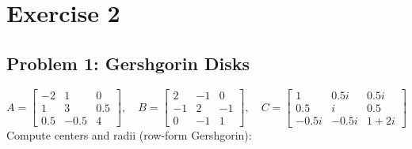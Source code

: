 \section{Exercise 2}
\subsection{Problem 1: Gershgorin Disks}
\[
    A = \begin{bmatrix}
        -2  & 1    & 0   \\
        1   & 3    & 0.5 \\
        0.5 & -0.5 & 4
    \end{bmatrix},
    \quad
    B = \begin{bmatrix}
        2  & -1 & 0  \\
        -1 & 2  & -1 \\
        0  & -1 & 1
    \end{bmatrix},
    \quad
    C = \begin{bmatrix}
        1     & 0.5i  & 0.5i   \\
        0.5   & i     & 0.5    \\
        -0.5i & -0.5i & 1 + 2i
    \end{bmatrix}
\]
Compute centers and radii (row-form Gershgorin):

